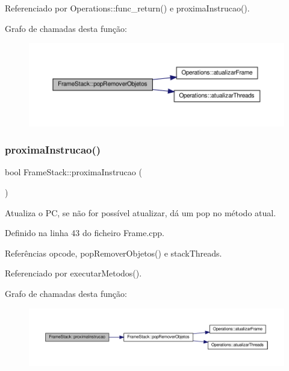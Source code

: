 Referenciado por Operations\+::func\+\_\+return() e proxima\+Instrucao().

Grafo de chamadas desta função\+:
\nopagebreak
\begin{figure}[H]
\begin{center}
\leavevmode
\includegraphics[width=350pt]{classFrameStack_a95dd5d1d253758f1fa7a4a2371ff1545_cgraph}
\end{center}
\end{figure}
\mbox{\label{classFrameStack_ad5ddcee58ef6c1306b47168846285b4f}} 
\subsubsection{\texorpdfstring{proxima\+Instrucao()}{proximaInstrucao()}}
{\footnotesize\ttfamily bool Frame\+Stack\+::proxima\+Instrucao (\begin{DoxyParamCaption}{ }\end{DoxyParamCaption})\hspace{0.3cm}{\ttfamily [private]}}



Atualiza o PC, se não for possível atualizar, dá um pop no método atual. 



Definido na linha 43 do ficheiro Frame.\+cpp.



Referências opcode, pop\+Remover\+Objetos() e stack\+Threads.



Referenciado por executar\+Metodos().

Grafo de chamadas desta função\+:
\nopagebreak
\begin{figure}[H]
\begin{center}
\leavevmode
\includegraphics[width=350pt]{classFrameStack_ad5ddcee58ef6c1306b47168846285b4f_cgraph}
\end{center}
\end{figure}


